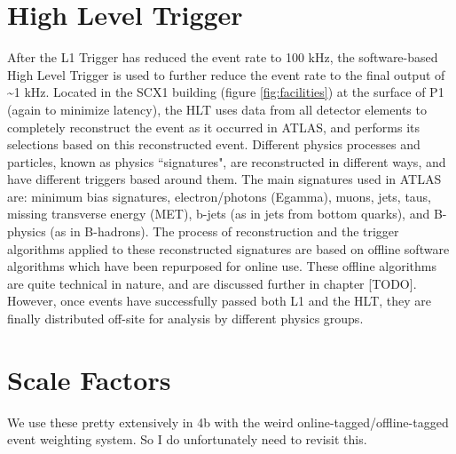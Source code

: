 \section{High Level Trigger}
    After the L1 Trigger has reduced the event rate to 100 kHz, the software-based High Level Trigger is used to further reduce the event rate to the final output of \textasciitilde 1 kHz.
    Located in the SCX1 building (figure \ref{fig:facilities}) at the surface of P1 (again to minimize latency), the HLT uses data from all detector elements to completely reconstruct the event as it occurred in ATLAS, and performs its selections based on this reconstructed event.
    Different physics processes and particles, known as physics ``signatures", are reconstructed in different ways, and have different triggers based around them. 
    The main signatures used in ATLAS are: minimum bias signatures, electron/photons (Egamma), muons, jets, taus, missing transverse energy (MET), b-jets (as in jets from bottom quarks), and B-physics (as in B-hadrons).
    The process of reconstruction and the trigger algorithms applied to these reconstructed signatures are based on offline software algorithms which have been repurposed for online use.
    These offline algorithms are quite technical in nature, and are discussed further in chapter [TODO].
    However, once events have successfully passed both L1 and the HLT, they are finally distributed off-site for analysis by different physics groups.


\section{Scale Factors} %
    We use these pretty extensively in 4b with the weird online-tagged/offline-tagged event weighting system.
    So I do unfortunately need to revisit this.
